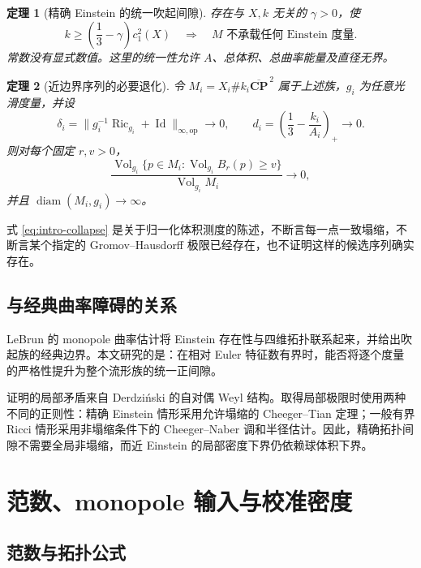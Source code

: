 \documentclass[UTF8,fontset=fandol,zihao=-4]{ctexart}
\theoremstyle{cn}
\newtheorem{theorem}{定理}[section]
\DeclareMathOperator{\Ric}{Ric}
\DeclareMathOperator{\Vol}{Vol}
\DeclareMathOperator{\diam}{diam}
\DeclareMathOperator{\Id}{Id}
\newcommand{\op}{\mathrm{op}}
\numberwithin{equation}{section}
\begin{document}
\begin{theorem}[精确 Einstein 的统一吹起间隙]\label{thm:intro-exact}
存在与 $X,k$ 无关的 $\gamma>0$，使
\[
k\ge\left(\frac13-\gamma\right)c_1^2(X)
\quad\Longrightarrow\quad
M\text{ 不承载任何 Einstein 度量}.
\]
常数没有显式数值。这里的统一性允许 $A$、总体积、总曲率能量及直径无界。
\end{theorem}

\begin{theorem}[近边界序列的必要退化]\label{thm:intro-collapse}
令 $M_i=X_i\#k_i\overline{\mathbf{CP}}^{\,2}$ 属于上述族，$g_i$ 为任意光滑度量，并设
\[
\delta_i=\|g_i^{-1}\Ric_{g_i}+\Id\|_{\infty,\op}\longrightarrow0,
\qquad d_i=\left(\frac13-\frac{k_i}{A_i}\right)_+\longrightarrow0.
\]
则对每个固定 $r,v>0$，
\begin{equation}\label{eq:intro-collapse}
\frac{\Vol_{g_i}\{p\in M_i:\Vol_{g_i}B_r(p)\ge v\}}
{\Vol_{g_i}M_i}\longrightarrow0,
\end{equation}
并且 $\diam(M_i,g_i)\to\infty$。
\end{theorem}

式 \eqref{eq:intro-collapse} 是关于归一化体积测度的陈述，不断言每一点一致塌缩，不断言某个指定的 Gromov--Hausdorff 极限已经存在，也不证明这样的候选序列确实存在。

\subsection{与经典曲率障碍的关系}

LeBrun 的 monopole 曲率估计将 Einstein 存在性与四维拓扑联系起来，并给出吹起族的经典边界\cite{lebrun2001,lebrun2004}。本文研究的是：在相对 Euler 特征数有界时，能否将逐个度量的严格性提升为整个流形族的统一正间隙。

证明的局部矛盾来自 Derdziński 的自对偶 Weyl 结构\cite{derd}。取得局部极限时使用两种不同的正则性：精确 Einstein 情形采用允许塌缩的 Cheeger--Tian 定理\cite{ct,gejiang}；一般有界 Ricci 情形采用非塌缩条件下的 Cheeger--Naber 调和半径估计\cite{cn}。因此，精确拓扑间隙不需要全局非塌缩，而近 Einstein 的局部密度下界仍依赖球体积下界。

\section{范数、monopole 输入与校准密度}

\subsection{范数与拓扑公式}
\end{document}
